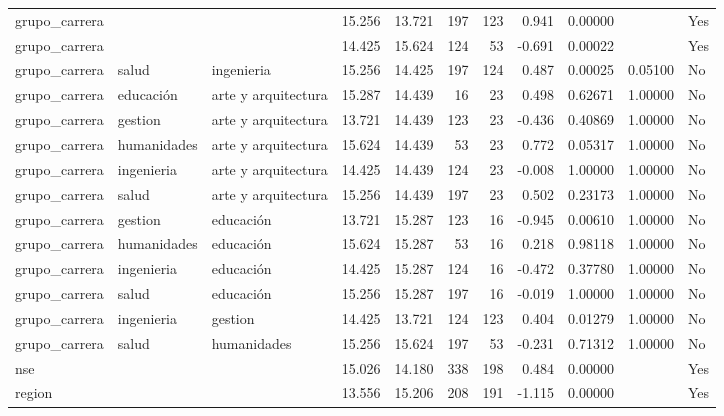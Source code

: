 \documentclass[
  letterpaper,
  DIV=11,
  numbers=noendperiod]{scrartcl}
\begin{document}
\begin{table}
\begin{tabular*}{\linewidth}{@{\extracolsep{\fill}}lllrrrrrrrl}
grupo\_carrera & {\cellcolor[HTML]{90EE90}{salud}} & {\cellcolor[HTML]{90EE90}{gestion}} & 15.256 & 13.721 & 197 & 123 & 0.941 & 0.00000 & {\cellcolor[HTML]{90EE90}{0.00000}} & Yes \\ 
grupo\_carrera & {\cellcolor[HTML]{90EE90}{ingenieria}} & {\cellcolor[HTML]{90EE90}{humanidades}} & 14.425 & 15.624 & 124 & 53 & -0.691 & 0.00022 & {\cellcolor[HTML]{90EE90}{0.04488}} & Yes \\ 
grupo\_carrera & salud & ingenieria & 15.256 & 14.425 & 197 & 124 & 0.487 & 0.00025 & 0.05100 & No \\ 
grupo\_carrera & educación & arte y arquitectura & 15.287 & 14.439 & 16 & 23 & 0.498 & 0.62671 & 1.00000 & No \\ 
grupo\_carrera & gestion & arte y arquitectura & 13.721 & 14.439 & 123 & 23 & -0.436 & 0.40869 & 1.00000 & No \\ 
grupo\_carrera & humanidades & arte y arquitectura & 15.624 & 14.439 & 53 & 23 & 0.772 & 0.05317 & 1.00000 & No \\ 
grupo\_carrera & ingenieria & arte y arquitectura & 14.425 & 14.439 & 124 & 23 & -0.008 & 1.00000 & 1.00000 & No \\ 
grupo\_carrera & salud & arte y arquitectura & 15.256 & 14.439 & 197 & 23 & 0.502 & 0.23173 & 1.00000 & No \\ 
grupo\_carrera & gestion & educación & 13.721 & 15.287 & 123 & 16 & -0.945 & 0.00610 & 1.00000 & No \\ 
grupo\_carrera & humanidades & educación & 15.624 & 15.287 & 53 & 16 & 0.218 & 0.98118 & 1.00000 & No \\ 
grupo\_carrera & ingenieria & educación & 14.425 & 15.287 & 124 & 16 & -0.472 & 0.37780 & 1.00000 & No \\ 
grupo\_carrera & salud & educación & 15.256 & 15.287 & 197 & 16 & -0.019 & 1.00000 & 1.00000 & No \\ 
grupo\_carrera & ingenieria & gestion & 14.425 & 13.721 & 124 & 123 & 0.404 & 0.01279 & 1.00000 & No \\ 
grupo\_carrera & salud & humanidades & 15.256 & 15.624 & 197 & 53 & -0.231 & 0.71312 & 1.00000 & No \\ 
nse & {\cellcolor[HTML]{90EE90}{Medio/Alto}} & {\cellcolor[HTML]{90EE90}{Bajo}} & 15.026 & 14.180 & 338 & 198 & 0.484 & 0.00000 & {\cellcolor[HTML]{90EE90}{0.00000}} & Yes \\ 
region & {\cellcolor[HTML]{90EE90}{selva}} & {\cellcolor[HTML]{90EE90}{costa}} & 13.556 & 15.206 & 208 & 191 & -1.115 & 0.00000 & {\cellcolor[HTML]{90EE90}{0.00000}} & Yes \\ 

\end{tabular*}
\end{table}
\end{document}
